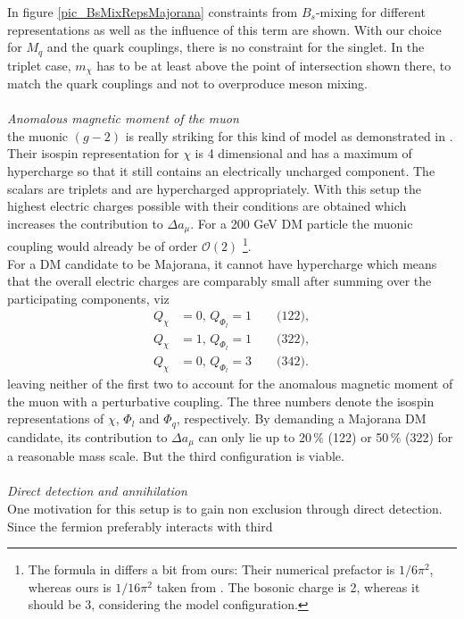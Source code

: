 In figure \ref{pic_BsMixRepsMajorana} constraints from $B_s$-mixing for different representations as well as the influence of this term are shown.
With our choice for $M_q$ and the quark couplings, there is no constraint for the singlet. In the triplet case, $m_\chi$ has to be at
least above the point of intersection shown there, to match the quark couplings and not to overproduce meson mixing.
\\ \\ \textit{Anomalous magnetic moment of the muon}\\
\noindent the muonic $(g-2)$ is really striking for this kind of model as demonstrated in \cite{Grip}. Their isospin representation for $\chi$ is
4 dimensional and has a maximum of hypercharge so that it still contains an electrically uncharged component. The scalars are triplets and 
are hypercharged appropriately. With this setup the highest electric charges possible with their conditions are obtained which increases the 
contribution to $\Delta a_\mu$. For a 200 GeV DM particle the muonic coupling would already be of order $\mathcal{O}(2)$ \footnote[2]{The 
formula in \cite{Grip} differs a bit from ours: Their numerical prefactor is $1/6\pi^2$, whereas ours is $1/16\pi^2$ taken from \cite{Lavoura}.
The bosonic charge is 2, whereas it should be 3, considering the model configuration.}.\\
\noindent For a DM candidate to be Majorana, it cannot have hypercharge which means that the overall electric charges are comparably small
after summing over the participating components, viz
\begin{align}
 Q_\chi &= 0,\,Q_{\Phi_l} = 1 \qquad \text{(122)},\\
 Q_\chi &= 1,\,Q_{\Phi_l} = 1 \qquad \text{(322)},\\
 Q_\chi &= 0,\,Q_{\Phi_l} = 3 \qquad \text{(342)}.
\end{align}
leaving neither of the first two to account for the anomalous magnetic moment of the muon with a perturbative coupling. The three numbers denote
the isospin representations of $\chi$, $\Phi_l$ and $\Phi_q$, respectively. By demanding a Majorana DM candidate, its contribution to 
$\Delta a_\mu$ can only lie up to 20$\,\%$ (122) or 50$\,\%$ (322) for a reasonable 
mass scale. But the third configuration is viable.
\\ \\ \textit{Direct detection and annihilation}\\
\noindent One motivation for this setup is to gain non exclusion through direct detection. Since the fermion preferably interacts with third 
